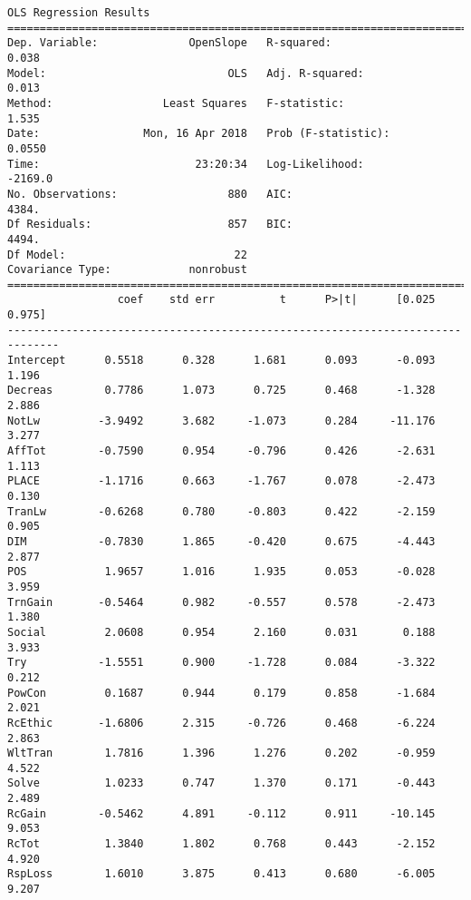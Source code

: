 \documentclass[11pt]{article}
\begin{document}
    \begin{Verbatim}[commandchars=\\\{\}]
                            OLS Regression Results                            
==============================================================================
Dep. Variable:              OpenSlope   R-squared:                       0.038
Model:                            OLS   Adj. R-squared:                  0.013
Method:                 Least Squares   F-statistic:                     1.535
Date:                Mon, 16 Apr 2018   Prob (F-statistic):             0.0550
Time:                        23:20:34   Log-Likelihood:                -2169.0
No. Observations:                 880   AIC:                             4384.
Df Residuals:                     857   BIC:                             4494.
Df Model:                          22                                         
Covariance Type:            nonrobust                                         
==============================================================================
                 coef    std err          t      P>|t|      [0.025      0.975]
------------------------------------------------------------------------------
Intercept      0.5518      0.328      1.681      0.093      -0.093       1.196
Decreas        0.7786      1.073      0.725      0.468      -1.328       2.886
NotLw         -3.9492      3.682     -1.073      0.284     -11.176       3.277
AffTot        -0.7590      0.954     -0.796      0.426      -2.631       1.113
PLACE         -1.1716      0.663     -1.767      0.078      -2.473       0.130
TranLw        -0.6268      0.780     -0.803      0.422      -2.159       0.905
DIM           -0.7830      1.865     -0.420      0.675      -4.443       2.877
POS            1.9657      1.016      1.935      0.053      -0.028       3.959
TrnGain       -0.5464      0.982     -0.557      0.578      -2.473       1.380
Social         2.0608      0.954      2.160      0.031       0.188       3.933
Try           -1.5551      0.900     -1.728      0.084      -3.322       0.212
PowCon         0.1687      0.944      0.179      0.858      -1.684       2.021
RcEthic       -1.6806      2.315     -0.726      0.468      -6.224       2.863
WltTran        1.7816      1.396      1.276      0.202      -0.959       4.522
Solve          1.0233      0.747      1.370      0.171      -0.443       2.489
RcGain        -0.5462      4.891     -0.112      0.911     -10.145       9.053
RcTot          1.3840      1.802      0.768      0.443      -2.152       4.920
RspLoss        1.6010      3.875      0.413      0.680      -6.005       9.207

\end{Verbatim}
\end{document}
